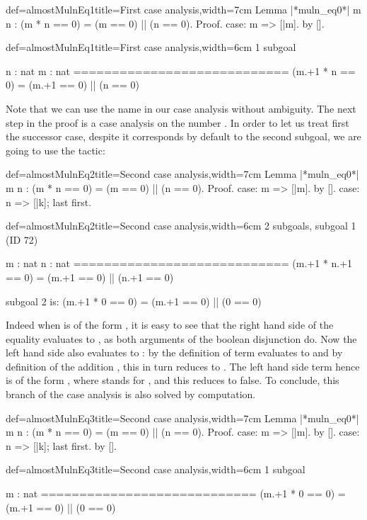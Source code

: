 \begin{coq}{def=almostMulnEq1}{title=First case analysis,width=7cm}
Lemma |*muln_eq0*| m n :
  (m * n == 0) = (m == 0) || (n == 0).
Proof.
case: m => [|m].
  by [].
\end{coq}
\begin{coqout}{def=almostMulnEq1}{title=First case analysis,width=6cm}
1 subgoal

n : nat
m : nat
============================
(m.+1 * n == 0) =
(m.+1 == 0) || (n == 0)
\end{coqout}
Note that we can use the name  in our case analysis without
ambiguity. The next step in the proof is a case analysis on the number
. 
In order to let us treat first the successor case,
despite it corresponds by default to the second subgoal, we are going
to use the  tactic:

\begin{coq}{def=almostMulnEq2}{title=Second case analysis,width=7cm}
Lemma |*muln_eq0*| m n :
  (m * n == 0) = (m == 0) || (n == 0).
Proof.
case: m => [|m].
  by [].
case: n => [|k]; last first.
\end{coq}
\begin{coqout}{def=almostMulnEq2}{title=Second case analysis,width=6cm}
2 subgoals, subgoal 1 (ID 72)

m : nat
n : nat
============================
(m.+1 * n.+1 == 0) =
(m.+1 == 0) || (n.+1 == 0)

subgoal 2 is:
 (m.+1 * 0 == 0) =
 (m.+1 == 0) || (0 == 0)
\end{coqout}
Indeed when  is of the form , it is easy to see that the
right hand side of the equality evaluates to , as both
arguments of the boolean disjunction do. Now the left hand side also
evaluates to : by the definition of  term
 evaluates to  and by
definition of the addition , this in turn reduces to
. The left hand side term hence is of the form
, where  stands for , and this
reduces to false. To conclude, this branch of the case analysis is
also solved by computation.

\begin{coq}{def=almostMulnEq3}{title=Second case analysis,width=7cm}
Lemma |*muln_eq0*| m n :
  (m * n == 0) = (m == 0) || (n == 0).
Proof.
case: m => [|m].
  by [].
case: n => [|k]; last first.
  by [].
\end{coq}
\begin{coqout}{def=almostMulnEq3}{title=Second case analysis,width=6cm}
1 subgoal

m : nat
============================
(m.+1 * 0 == 0) =
(m.+1 == 0) || (0 == 0)
\end{coqout}

